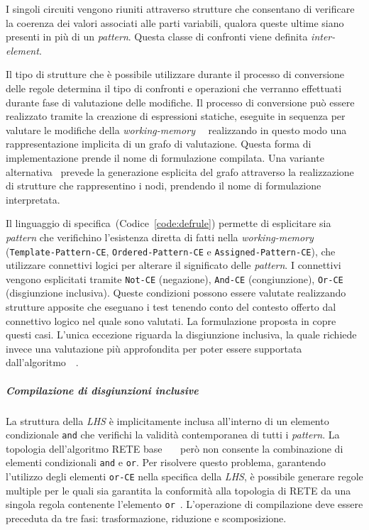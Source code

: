 I singoli circuiti vengono riuniti attraverso strutture che consentano di verificare la coerenza dei valori associati alle parti variabili, qualora queste ultime siano presenti in più di un \emph{pattern}. Questa classe di confronti viene definita \emph{inter-element}.

Il tipo di strutture che è possibile utilizzare durante il processo di conversione delle regole determina il tipo di confronti e operazioni che verranno effettuati durante fase di valutazione delle modifiche. Il processo di conversione può essere realizzato tramite la creazione di espressioni statiche, eseguite in sequenza per valutare le modifiche della \emph{working-memory}~\cite{forgy1979}~\cite{forgy1982} realizzando in questo modo una rappresentazione implicita di un grafo di valutazione. Questa forma di implementazione prende il nome di formulazione compilata. Una variante alternativa~\cite{Doorenbos95productionmatching} prevede la generazione esplicita del grafo attraverso la realizzazione di strutture che rappresentino i nodi, prendendo il nome di formulazione interpretata.

Il linguaggio di specifica~(Codice~\ref{code:defrule}) permette di esplicitare sia \emph{pattern} che verifichino l'esistenza diretta di fatti nella \emph{working-memory} (\texttt{Template\--Pattern\--CE}, \texttt{Ordered-Pattern-CE} e \texttt{Assigned-Pattern-CE}), che utilizzare connettivi logici per alterare il significato delle \emph{pattern}. I connettivi vengono esplicitati tramite \texttt{Not-CE} (negazione), \texttt{And-CE} (congiunzione), \texttt{Or-CE} (disgiunzione inclusiva). Queste condizioni possono essere valutate realizzando strutture apposite che eseguano i test tenendo conto del contesto offerto dal connettivo logico nel quale sono valutati. La formulazione proposta in \cite{Doorenbos95productionmatching} copre questi casi.
L'unica eccezione riguarda la disgiunzione inclusiva, la quale richiede invece una valutazione più approfondita per poter essere supportata dall'algoritmo~\cite{advacesrete}~\cite{Gordin:1991:SCR:115790.115797}.

\subparagraph{Compilazione di disgiunzioni inclusive}

La struttura della \emph{LHS} è implicitamente inclusa all'interno di un elemento condizionale \texttt{and} che verifichi la validità contemporanea di tutti i \emph{pattern}. La topologia dell'algoritmo RETE base~\cite{forgy1979}~\cite{forgy1982}~\cite{Doorenbos95productionmatching} però non consente la combinazione di elementi condizionali \texttt{and} e \texttt{or}. Per risolvere questo problema, garantendo l'utilizzo degli elementi \texttt{or-CE} nella specifica della \emph{LHS}, è possibile generare regole multiple per le quali sia garantita la conformità alla topologia di RETE da una singola regola contenente l'elemento \texttt{or}~\cite{clipsarch1992}. 
L'operazione di compilazione deve essere preceduta da tre fasi: trasformazione, riduzione e scomposizione.

